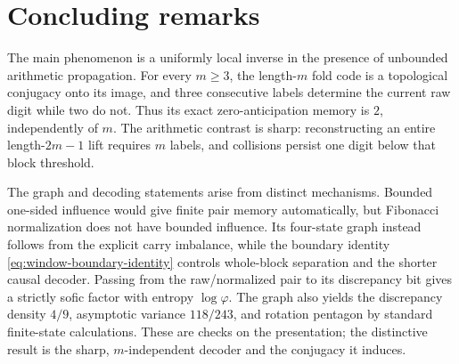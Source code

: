 \section{Concluding remarks}
\label{sec:discussion}

The main phenomenon is a uniformly local inverse in the presence of unbounded arithmetic propagation. For every \(m\ge3\), the length-\(m\) fold code is a topological conjugacy onto its image, and three consecutive labels determine the current raw digit while two do not. Thus its exact zero-anticipation memory is \(2\), independently of \(m\). The arithmetic contrast is sharp: reconstructing an entire length-\(2m-1\) lift requires \(m\) labels, and collisions persist one digit below that block threshold.

The graph and decoding statements arise from distinct mechanisms. Bounded one-sided influence would give finite pair memory automatically, but Fibonacci normalization does not have bounded influence. Its four-state graph instead follows from the explicit carry imbalance, while the boundary identity \eqref{eq:window-boundary-identity} controls whole-block separation and the shorter causal decoder. Passing from the raw/normalized pair to its discrepancy bit gives a strictly sofic factor with entropy \(\log\varphi\). The graph also yields the discrepancy density \(4/9\), asymptotic variance \(118/243\), and rotation pentagon by standard finite-state calculations. These are checks on the presentation; the distinctive result is the sharp, \(m\)-independent decoder and the conjugacy it induces.
